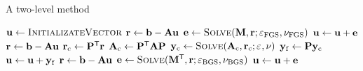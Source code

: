 \begin{algorithm}[H]
    \caption{A two-level method}
    \label{alg:two-level}
    \(\uu \gets \textsc{InitializateVector}\) \;
    \(\rr \gets \bb - \A \uu\) \;
    \(\ee \gets \textsc{Solve}(\M, \rr; \tol{\FGS}, \niter{\FGS})\) \;
    \(\uu \gets \uu + \ee\) \;
    \(\rr \gets \bb - \A \uu\) \;
    \(\rrc \gets \PP^\mathsf{T} \rr\) \;
    \(\Ac \gets \PP^\mathsf{T} \A \PP\) \;
    \(\yyc \gets \textsc{Solve}( \Ac, \rrc; \tol{}, \niter{})\) \;
    \(\yyf \gets \PP \yyc\) \;
    \(\uu \gets \uu + \yyf\) \;
    \(\rr \gets \bb - \A \uu\) \;
    \(\ee \gets \textsc{Solve}(\M^\mathsf{T}, \rr; \tol{\BGS}, \niter{\BGS})\) \;
    \(\uu \gets \uu + \ee\) \;
\end{algorithm}
